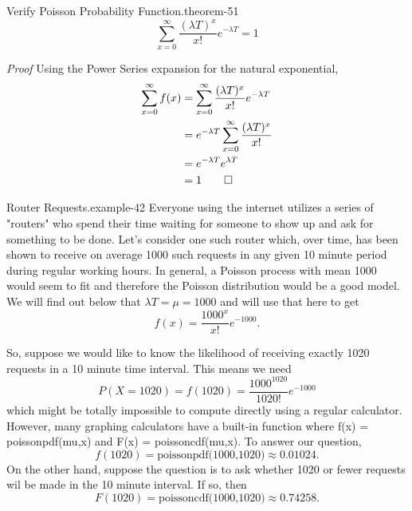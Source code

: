 \documentclass[10pt,]{book}
\makeatletter
\renewcommand*{\proofname}{Proof}
\renewenvironment{proof}[1][\proofname]{\par
  \pushQED{\qed}%
  \normalfont \topsep6\p@\@plus6\p@\relax
  \trivlist
  \item\relax
    {\itshape
    #1\@addpunct{.}}\hspace\labelsep\ignorespaces
}{%
  \popQED\endtrivlist\@endpefalse
}
\numberwithin{equation}{section}
\makeatother
\begin{document}
%
\par
\hypertarget{p-1041}{}%
\begin{theorem}{Verify Poisson Probability Function.}{}{theorem-51}%
\hypertarget{p-1042}{}%
%
\begin{equation*}
\sum_{x=0}^{\infty} \frac{(\lambda T)^x}{x!} e^{-\lambda T} = 1
\end{equation*}
%
\end{theorem}
\begin{proof}\hypertarget{proof-54}{}
\hypertarget{p-1043}{}%
Using the Power Series expansion for the natural exponential,%
\begin{align*}
\sum_{x=0}^{\infty} f(x) & = \sum_{x=0}^{\infty} \frac{(\lambda T)^x}{x!} e^{-\lambda T} \\
& = e^{-\lambda T} \sum_{x=0}^{\infty} \frac{(\lambda T)^x}{x!} \\
& = e^{-\lambda T} e^{\lambda T}  \\
& = 1\qedhere
\end{align*}
%
\end{proof}
%
\par
\hypertarget{p-1044}{}%
\begin{example}{Router Requests.}{example-42}%
\hypertarget{p-1045}{}%
Everyone using the internet utilizes a series of "routers" who spend their time waiting for someone to show up and ask for something to be done. Let's consider one such router which, over time, has been shown to receive on average 1000 such requests in any given 10 minute period during regular working hours. In general, a Poisson process with mean 1000 would seem to fit and therefore the Poisson distribution would be a good model. We will find out below that \(\lambda T = \mu = 1000\) and will use that here to get%
\begin{equation*}
f(x) = \frac{1000^x}{x!} e^{-1000}.
\end{equation*}
%
\par
\hypertarget{p-1046}{}%
So, suppose we would like to know the likelihood of receiving exactly 1020 requests in a 10 minute time interval.  This means we need%
\begin{equation*}
P(X = 1020) = f(1020) = \frac{1000^{1020}}{1020!} e^{-1000}
\end{equation*}
which might be totally impossible to compute directly using a regular calculator. However, many graphing calculators have a built-in function where f(x) = poissonpdf(mu,x) and F(x) = poissoncdf(mu,x). To answer our question,%
\begin{equation*}
f(1020) = \text{poissonpdf(1000,1020)} \approx 0.01024.
\end{equation*}
On the other hand, suppose the question is to ask whether 1020 or fewer requests wil be made in the 10 minute interval. If so, then%
\begin{equation*}
F(1020) = \text{poissoncdf(1000,1020)} \approx 0.74258.
\end{equation*}
%
\end{example}
\end{document}
